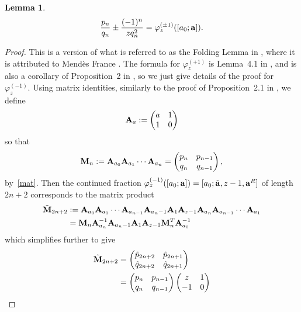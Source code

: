 \documentclass[12pt,a4paper]{amsart}
\newtheorem{lemma}[theorem]{Lemma}
\theoremstyle{definition}
\numberwithin{equation}{section}
\begin{document}
\begin{lemma}
\label{trans} 
\begin{equation}
\label{pqsum} 
\frac{p_n}{q_n}\pm \frac{(-1)^n}{zq_n^2} = \varphi_z^{(\pm 1)}([a_0;{\bf a}]). 
\end{equation} 
\end{lemma}

\begin{proof} 
This is a version of what is referred to as the Folding Lemma in \cite{adamc}, where it is 
attributed to Mend\`es France \cite{MF}. 
The formula for $\varphi_z^{(+ 1)}$ is Lemma~4.1 in \cite{HoneVar}, and is also a corollary 
of Proposition~2 in \cite{folded}, so we just give details of the proof for $\varphi_z^{(-1)}$. 
Using matrix identities, similarly to  
the proof of 
Proposition~2.1 in \cite{Hone2}, we define 
\[ 
{\bf A}_{a} := 
\begin{pmatrix} 
a & 1 \\ 
1 & 0 
\end{pmatrix} 
\]
so that 
\[ 
{\bf M}_n := {\bf A}_{a_0} {\bf A}_{a_1}\cdots {\bf A}_{a_n} 
= 
\begin{pmatrix} 
p_n & p_{n-1}\\ 
q_n & q_{n-1}
\end{pmatrix}, 
\] 
by~\eqref{mat}. 
Then the continued fraction $\varphi_z^{(- 1)}([a_0;{\bf a}]) = [a_0; \tilde{{\bf a}}, z-1, {\bf a}^R]$ 
of length $2n+2$ corresponds to the matrix product 
\begin{align*} 
\tilde{{\bf M}}_{2n+2} 
& := {\bf A}_{a_0} {\bf A}_{a_1}\cdots {\bf A}_{a_{n-1}} {\bf A}_{a_n-1} {\bf A}_{1} {\bf A}_{z-1} 
{\bf A}_{a_n} {\bf A}_{a_{n-1}}\cdots {\bf A}_{a_{1}} \\ 
& = {\bf M}_n {\bf A}_{a_n}^{-1} {\bf A}_{a_n-1} {\bf A}_{1} {\bf A}_{z-1} {\bf M}_n^T {\bf A}_{a_0}^{-1} 
\end{align*} 
which simplifies further to give 
\begin{align*} 
\tilde{{\bf M}}_{2n+2}
& =  
\begin{pmatrix} 
\tilde{p}_{2n+2} & \tilde{p}_{2n+1}\\ 
\tilde{q}_{2n+2} & \tilde{q}_{2n+1}
\end{pmatrix} \\
& = \begin{pmatrix} 
p_n & p_{n-1}\\ 
q_n & q_{n-1}
\end{pmatrix} 
\begin{pmatrix} 
z & 1\\ 
-1 & 0

\end{pmatrix}
\end{align*}
\end{proof}
\end{document}
